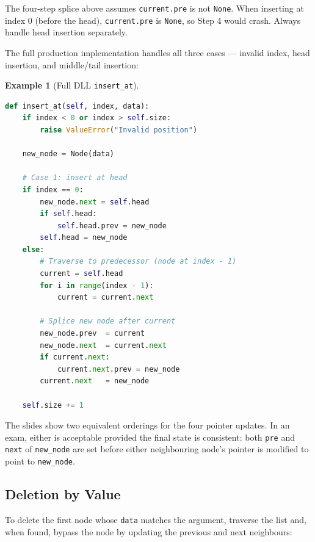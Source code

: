 \documentclass[11pt, a4paper, notitlepage]{report}
\theoremstyle{definition}
\theoremstyle{remark}
\theoremstyle{definition}
\newtheorem{example}[theorem]{Example}
\begin{document}
\begin{warning}[title={Warning: Head Insertion is a Special Case}]
The four-step splice above assumes \texttt{current.pre} is not \texttt{None}.
When inserting at index 0 (before the head), \texttt{current.pre} is
\texttt{None}, so Step 4 would crash. Always handle head insertion separately.
\end{warning}

The full production implementation handles all three cases --- invalid index,
head insertion, and middle/tail insertion:

\begin{example}[Full DLL \texttt{insert\_at}]
\leavevmode
\begin{lstlisting}[language=Python]
def insert_at(self, index, data):
    if index < 0 or index > self.size:
        raise ValueError("Invalid position")

    new_node = Node(data)

    # Case 1: insert at head
    if index == 0:
        new_node.next = self.head
        if self.head:
            self.head.prev = new_node
        self.head = new_node
    else:
        # Traverse to predecessor (node at index - 1)
        current = self.head
        for i in range(index - 1):
            current = current.next

        # Splice new node after current
        new_node.prev  = current
        new_node.next  = current.next
        if current.next:
            current.next.prev = new_node
        current.next   = new_node

    self.size += 1
\end{lstlisting}
\end{example}

\begin{examtip}[title={Exam Tip: Insertion Order Variants}]
The slides show two equivalent orderings for the four pointer updates. In an
exam, either is acceptable provided the final state is consistent: both
\texttt{pre} and \texttt{next} of \texttt{new\_node} are set before either
neighbouring node's pointer is modified to point to \texttt{new\_node}.
\end{examtip}

\subsection{Deletion by Value}
\label{subsec:dll-delete-data}

To delete the first node whose \texttt{data} matches the argument, traverse
the list and, when found, bypass the node by updating the previous and next
neighbours:
\end{document}
